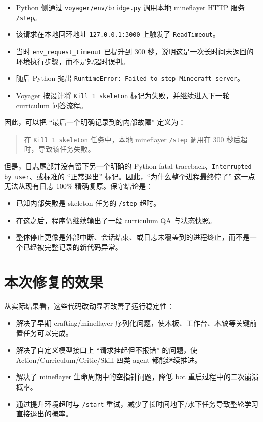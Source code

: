 \documentclass[11pt,a4paper]{ctexart}
\begin{document}
\begin{itemize}
  \item Python 侧通过 \texttt{voyager/env/bridge.py} 调用本地 mineflayer HTTP 服务 \texttt{/step}。
  \item 该请求在本地回环地址 \texttt{127.0.0.1:3000} 上触发了 \texttt{ReadTimeout}。
  \item 当时 \texttt{env\_request\_timeout} 已提升到 300 秒，说明这是一次长时间未返回的环境执行步骤，而不是短超时误判。
  \item 随后 Python 抛出 \texttt{RuntimeError: Failed to step Minecraft server}。
  \item Voyager 按设计将 \texttt{Kill 1 skeleton} 标记为失败，并继续进入下一轮 curriculum 问答流程。
\end{itemize}

因此，可以把 ``最后一个明确记录到的内部故障'' 定义为：

\begin{quote}
在 \texttt{Kill 1 skeleton} 任务中，本地 mineflayer \texttt{/step} 调用在 300 秒后超时，导致该任务失败。
\end{quote}

但是，日志尾部并没有留下另一个明确的 Python fatal traceback、\texttt{Interrupted by user}、或标准的 ``正常退出'' 标记。因此，``为什么整个进程最终停了'' 这一点无法从现有日志 100\% 精确复原。保守结论是：

\begin{itemize}
  \item 已知内部失败是 skeleton 任务的 \texttt{/step} 超时。
  \item 在这之后，程序仍继续输出了一段 curriculum QA 与状态快照。
  \item 整体停止更像是外部中断、会话结束、或日志未覆盖到的进程终止，而不是一个已经被完整记录的新代码异常。
\end{itemize}

\section{本次修复的效果}

从实际结果看，这些代码改动显著改善了运行稳定性：

\begin{itemize}
  \item 解决了早期 crafting/mineflayer 序列化问题，使木板、工作台、木镐等关键前置任务可以完成。
  \item 解决了自定义模型接口上 ``请求挂起但不报错'' 的问题，使 Action/Curriculum/Critic/Skill 四类 agent 都能继续推进。
  \item 解决了 mineflayer 生命周期中的空指针问题，降低 bot 重启过程中的二次崩溃概率。
  \item 通过提升环境超时与 \texttt{/start} 重试，减少了长时间地下/水下任务导致整轮学习直接退出的概率。
\end{itemize}
\end{document}
